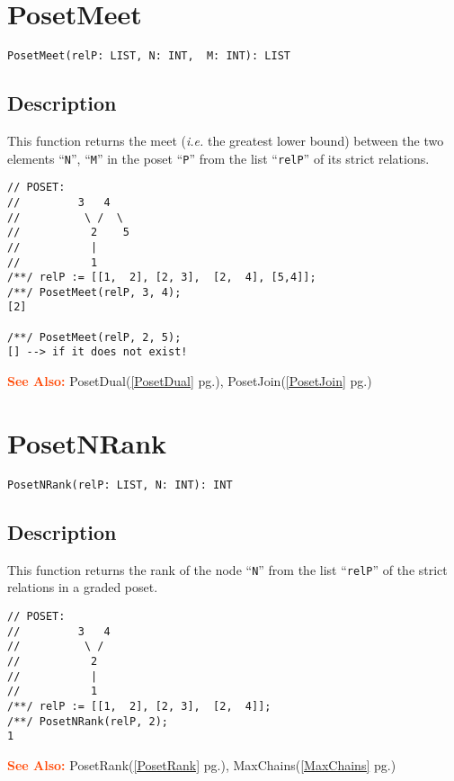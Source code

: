 \documentclass[a4paper]{mybook}
\newenvironment{command}{}{} %
\newcommand\SeeAlso{\par\textcolor{OrangeRed}{\textbf{\large See Also: }}}
\begin{document}
\section{PosetMeet}
\label{PosetMeet}
\begin{command} %


\begin{Verbatim}[label=syntax, rulecolor=\color{MidnightBlue},
frame=single]
PosetMeet(relP: LIST, N: INT,  M: INT): LIST
\end{Verbatim}


\subsection*{Description}

This function returns the meet (\textit{i.e.} the greatest lower bound)
between the two elements ``\verb&N&'', ``\verb&M&'' in the poset ``\verb&P&''
from the list ``\verb&relP&'' of its strict relations.
\begin{Verbatim}[label=example, rulecolor=\color{PineGreen}, frame=single]
// POSET:
//         3   4
//          \ /  \
//           2    5
//           |
//           1
/**/ relP := [[1,  2], [2, 3],  [2,  4], [5,4]];
/**/ PosetMeet(relP, 3, 4);
[2]

/**/ PosetMeet(relP, 2, 5);
[] --> if it does not exist!
\end{Verbatim}


\SeeAlso %
  PosetDual(\ref{PosetDual} pg.\pageref{PosetDual}), 
    PosetJoin(\ref{PosetJoin} pg.\pageref{PosetJoin})
\end{command} %

\section{PosetNRank}
\label{PosetNRank}
\begin{command} %


\begin{Verbatim}[label=syntax, rulecolor=\color{MidnightBlue},
frame=single]
PosetNRank(relP: LIST, N: INT): INT
\end{Verbatim}


\subsection*{Description}

This function returns the rank of the node ``\verb&N&'' from the list ``\verb&relP&''
of the strict relations in a graded poset.
\begin{Verbatim}[label=example, rulecolor=\color{PineGreen}, frame=single]
// POSET:
//         3   4
//          \ /
//           2
//           |
//           1
/**/ relP := [[1,  2], [2, 3],  [2,  4]];
/**/ PosetNRank(relP, 2);
1
\end{Verbatim}


\SeeAlso %
  PosetRank(\ref{PosetRank} pg.\pageref{PosetRank}), 
    MaxChains(\ref{MaxChains} pg.\pageref{MaxChains})
\end{command} %
\end{document}
